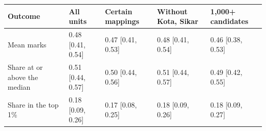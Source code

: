 {\scriptsize
\begin{tabular}{lllll}
\toprule
Outcome & All units & Certain mappings & Without Kota, Sikar & 1,000+ candidates \\
\midrule
Mean marks & 0.48 [0.41, 0.54] & 0.47 [0.41, 0.53] & 0.48 [0.41, 0.54] & 0.46 [0.38, 0.53] \\
Share at or above the median & 0.51 [0.44, 0.57] & 0.50 [0.44, 0.56] & 0.51 [0.44, 0.57] & 0.49 [0.42, 0.55] \\
Share in the top 1\% & 0.18 [0.09, 0.26] & 0.17 [0.08, 0.25] & 0.18 [0.09, 0.26] & 0.18 [0.09, 0.27] \\
\bottomrule
\end{tabular}}
